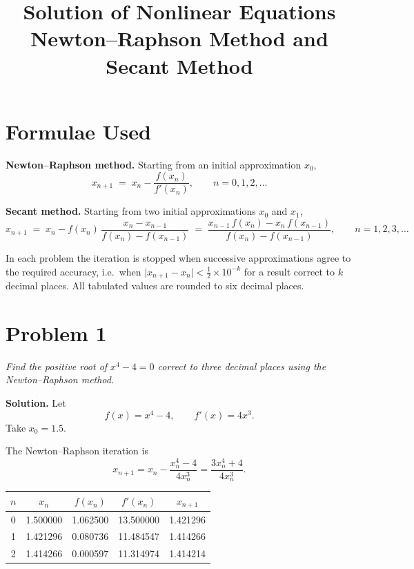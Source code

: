 \documentclass[11pt,a4paper]{article}
\title{\textbf{Solution of Nonlinear Equations}\\[4pt]
\large Newton--Raphson Method and Secant Method}
\author{}
\date{}
\begin{document}
\maketitle
\vspace{-3em}

\section*{Formulae Used}

\textbf{Newton--Raphson method.} Starting from an initial approximation $x_{0}$,
\begin{equation*}
x_{n+1} \;=\; x_{n}-\frac{f(x_{n})}{f'(x_{n})}, \qquad n=0,1,2,\ldots
\end{equation*}

\textbf{Secant method.} Starting from two initial approximations $x_{0}$ and $x_{1}$,
\begin{equation*}
x_{n+1} \;=\; x_{n}-f(x_{n})\,\frac{x_{n}-x_{n-1}}{f(x_{n})-f(x_{n-1})}
\;=\;\frac{x_{n-1}\,f(x_{n})-x_{n}\,f(x_{n-1})}{f(x_{n})-f(x_{n-1})},
\qquad n=1,2,3,\ldots
\end{equation*}

In each problem the iteration is stopped when successive approximations agree to the
required accuracy, i.e.\ when $\lvert x_{n+1}-x_{n}\rvert<\tfrac{1}{2}\times10^{-k}$
for a result correct to $k$ decimal places. All tabulated values are rounded to six
decimal places.

\section*{Problem 1}
\textit{Find the positive root of $x^{4}-4=0$ correct to three decimal places using
the Newton--Raphson method.}

\textbf{Solution.} Let
\[
f(x)=x^{4}-4, \qquad f'(x)=4x^{3}.
\]
Take $x_{0}=1.5$.

The Newton--Raphson iteration is
\[
x_{n+1}=x_{n}-\frac{x_{n}^{4}-4}{4x_{n}^{3}}=\frac{3x_{n}^{4}+4}{4x_{n}^{3}}.
\]

\begin{center}
\begin{tabular}{ccccc}
\toprule
$n$ & $x_{n}$ & $f(x_{n})$ & $f'(x_{n})$ & $x_{n+1}$ \\
\midrule
0 & 1.500000 & 1.062500 & 13.500000 & 1.421296 \\
1 & 1.421296 & 0.080736 & 11.484547 & 1.414266 \\
2 & 1.414266 & 0.000597 & 11.314974 & 1.414214 \\
\bottomrule
\end{tabular}
\end{center}
\end{document}
